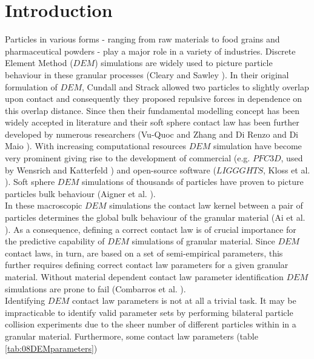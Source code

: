 \section{Introduction}
\label{sec:introduction}

Particles in various forms - ranging from raw materials to food grains and pharmaceutical powders - 
play a major role in a variety of industries. 
Discrete Element Method ($DEM$) simulations are widely used to picture particle
behaviour in these granular processes (Cleary and Sawley \cite{RefWorks:130}).
In their original formulation of $DEM$, Cundall and Strack \cite{RefWorks:172} allowed two 
particles to slightly overlap upon contact and consequently they proposed repulsive forces in dependence on this overlap distance. 
Since then their fundamental modelling concept has been widely accepted in literature 
and their soft sphere contact law has been further developed by numerous researchers 
(Vu-Quoc and Zhang \cite{RefWorks:148} and Di Renzo and Di Maio \cite{RefWorks:145}). 
With increasing computational resources $DEM$ simulation have become very prominent 
giving rise to the development of commercial (e.g. $PFC3D$, used by Wensrich and
Katterfeld \cite{RefWorks:87}) and open-source software ($LIGGGHTS$, Kloss et al. \cite{RefWorks:136}). 
Soft sphere $DEM$ simulations of thousands of particles have proven to 
picture particles bulk behaviour (Aigner et al. \cite{RefWorks:139}). \\
In these macroscopic $DEM$ simulations the contact law kernel between a 
pair of particles determines the global bulk behaviour of the granular material (Ai et al. \cite{RefWorks:131}). 
As a consequence, defining a correct contact law is of crucial importance for the predictive 
capability of $DEM$ simulations of granular material. 
Since $DEM$ contact laws, in turn, are based 
on a set of semi-empirical parameters, this further requires defining correct contact law 
parameters for a given granular material. 
Without material dependent contact law parameter identification $DEM$ simulations are prone to fail (Combarros et al. \cite{RefWorks:177}). \\
Identifying $DEM$ contact law parameters is not at all a trivial task. 
It may be impracticable to identify valid parameter sets by performing bilateral 
particle collision experiments due to the sheer number of different particles within in a granular material. 
Furthermore, some contact law parameters (table \ref{tab:08DEMparameters}) 
